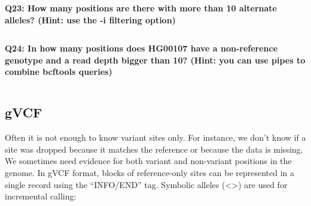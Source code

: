 \documentclass[11pt]{article}
\makeatletter
\newcommand{\boxspacing}{\kern\kvtcb@left@rule\kern\kvtcb@boxsep}
\newcommand{\prompt}[4]{
        {\ttfamily\llap{{\color{blue}\LARGE\faKeyboardO\hspace{3pt}#4}}\vspace{-\baselineskip}}
    }
\makeatother
\begin{document}
    \begin{tcolorbox}[breakable, size=fbox, boxrule=1pt, pad at break*=1mm,colback=cellbackground, colframe=cellborder]
\prompt{In}{incolor}{ }{\boxspacing}
\begin{Verbatim}[commandchars=\\\{\}]

\end{Verbatim}
\end{tcolorbox}

    \textbf{Q23: How many positions are there with more than 10 alternate
alleles? (Hint: use the -i filtering option)}

    \begin{tcolorbox}[breakable, size=fbox, boxrule=1pt, pad at break*=1mm,colback=cellbackground, colframe=cellborder]
\prompt{In}{incolor}{ }{\boxspacing}
\begin{Verbatim}[commandchars=\\\{\}]

\end{Verbatim}
\end{tcolorbox}

    \textbf{Q24: In how many positions does HG00107 have a non-reference
genotype and a read depth bigger than 10? (Hint: you can use pipes to
combine bcftools queries)}

    \begin{tcolorbox}[breakable, size=fbox, boxrule=1pt, pad at break*=1mm,colback=cellbackground, colframe=cellborder]
\prompt{In}{incolor}{ }{\boxspacing}
\begin{Verbatim}[commandchars=\\\{\}]

\end{Verbatim}
\end{tcolorbox}

    \hypertarget{gvcf}{%
\subsection{gVCF}\label{gvcf}}

Often it is not enough to know variant sites only. For instance, we
don't know if a site was dropped because it matches the reference or
because the data is missing. We sometimes need evidence for both variant
and non-variant positions in the genome. In gVCF format, blocks of
reference-only sites can be represented in a single record using the
``INFO/END'' tag. Symbolic alleles (\textless*\textgreater) are used for
incremental calling:
\end{document}
